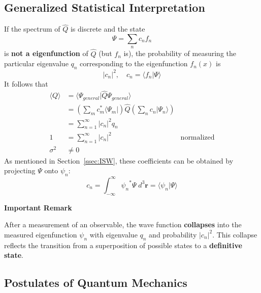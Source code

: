 \subsection{Generalized Statistical Interpretation}
If the spectrum of $\hat{Q}$ is discrete and the state
\begin{equation*}
    \Psi=\sum_n c_n f_n
\end{equation*}
is \textbf{not a eigenfunction} of $\hat{Q}$ (but $f_n$ is), the probability of measuring the particular eigenvalue $q_n$ corresponding to the eigenfunction $f_n(x)$ is
\noindent\begin{equation*}
    |c_n|^2, \quad c_n = \langle f_n|\Psi\rangle
\end{equation*}
It follows that
\noindent\begin{align*}
    \langle Q\rangle & = \langle\Psi_{general}|\hat{Q}\Psi_{general}\rangle                                                                 \\
                     & =\left(\sum_{m}c_{m}^{*}\langle\Psi_{m}|\right)\hat{Q}\left(\sum_{n}c_{n}|\Psi_{n}\rangle\right)                     \\
                     & = \sum_{n=1}^{\infty} |c_n|^2 q_n                                                                                    \\
    1                & =\sum_{n=1}^{\infty} |c_n|^2                                                                     & \text{normalized} \\
    \sigma^2         & \neq 0
\end{align*}
As mentioned in Section\ \ref{ssec:ISW}, these coefficients can be obtained by projecting $\Psi$ onto $\psi_n$:
\noindent\begin{equation*}
    c_n = \int_{-\infty}^{\infty} {\psi_n}^* \Psi\; d^3 \mathbf{r} = \langle \psi_n |\Psi \rangle
\end{equation*}

\textbf{Important Remark}

After a measurement of an observable, the wave function \textbf{collapses} into the measured eigenfunction $\psi_n$ with eigenvalue $q_n$ and probability $|c_n|^2$. This collapse reflects the transition from a superposition of possible states to a \textbf{definitive state}.

\subsection{Postulates of Quantum Mechanics}

